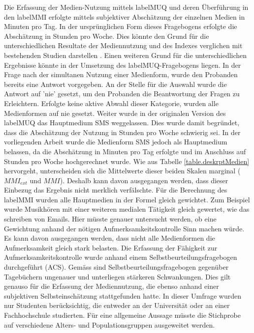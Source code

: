 \label{section.diskussion.methodenkritik}
Die Erfassung der Medien-Nutzung mittels \gls{labelMUQ} und deren Überführung in den \gls{labelMMI} erfolgte mittels subjektiver Abschätzung der einzelnen Medien in Minuten pro Tag. In der ursprünglichen Form dieses Fragebogens erfolgte die Abschätzung in Stunden pro Woche. Dies könnte den Grund für die unterschiedlichen Resultate der Mediennutzung und des Indexes verglichen mit bestehenden Studien darstellen \cite{Ophir2009,Alzahabi2013}. Einen weiteren Grund für die unterschiedlichen Ergebnisse könnte in der Umsetzung des \gls{labelMUQ}-Fragebogens liegen. In der Frage nach der simultanen Nutzung einer Medienform, wurde den Probanden bereits eine Antwort vorgegeben. An der Stelle für die Auswahl wurde die Antwort auf 'nie' gesetzt, um den Probanden die Beantwortung der Fragen zu Erleichtern. Erfolgte keine aktive Abwahl dieser Kategorie, wurden alle Medienformen auf nie gesetzt. Weiter wurde in der originalen Version des \gls{labelMUQ} das Hauptmedium SMS weggelassen. Dies wurde damit begründet, dass die Abschätzung der Nutzung in Stunden pro Woche schwierig sei. In der vorliegenden Arbeit wurde die Medienform SMS jedoch als Hauptmedium belassen, da die Abschätzung in Minuten pro Tag erfolgte und im Anschluss auf Stunden pro Woche hochgerechnet wurde. Wie aus Tabelle \ref{table.deskrptMedien} hervorgeht, unterscheiden sich die Mittelwerte dieser beiden Skalen marginal ($MMI_{ext}$ und $MMI$). Deshalb kann davon ausgegangen werden, dass dieser Einbezug das Ergebnis nicht merklich verfälschte. Für die Berechnung des \gls{labelMMI} wurden alle Hauptmedien in der Formel gleich gewichtet. Zum Beispiel wurde Musikhören mit einer weiteren medialen Tätigkeit gleich gewertet, wie das schreiben von Emails. Hier müsste genauer untersucht werden, ob eine Gewichtung anhand der nötigen Aufmerksamkeitskontrolle Sinn machen würde. Es kann davon ausgegangen werden, dass nicht alle Medienformen die Aufmerksamkeit gleich stark belasten. Die Erfassung der Fähigkeit zur Aufmerksamkeitskontrolle wurde anhand einem Selbstbeurteilungsfragebogen durchgeführt (ACS). Gemäss  sind Selbstbeurteilungsfragebogen gegenüber Tagebüchern ungenauer und unterliegen stärkeren Schwankungen. Dies gilt genauso für die Erfassung der Mediennutzung, die ebenso anhand einer subjektiven Selbsteinschätzung stattgefunden hatte. In dieser Umfrage wurden nur Studenten berücksichtig, die entweder an der Universität oder an einer Fachhochschule studierten. Für eine allgemeine Aussage müsste die Stichprobe auf verschiedene Alters- und Populationsgruppen ausgeweitet werden. 
